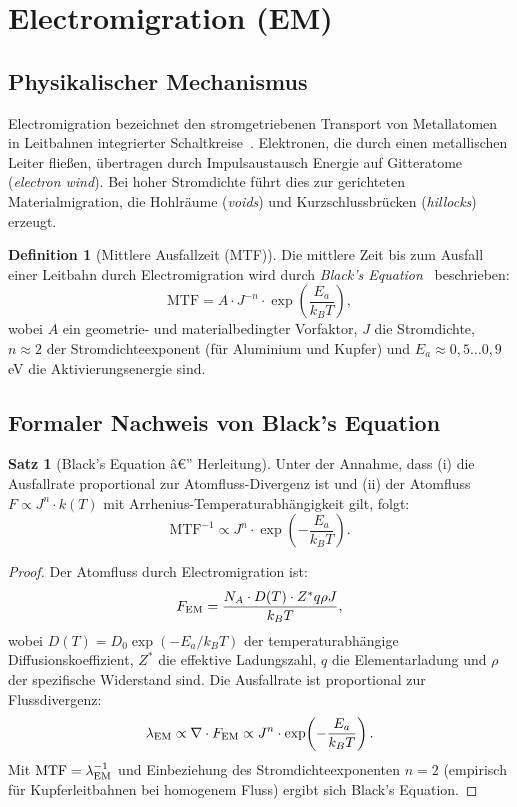 ﻿\documentclass[a4paper,12pt]{article}
\theoremstyle{definition}
\newtheorem{definition}{Definition}
\newtheorem{satz}{Satz}
\begin{document}
\section{Electromigration (EM)}
\label{sec:em}

\subsection{Physikalischer Mechanismus}

Electromigration bezeichnet den stromgetriebenen Transport von Metallatomen
in Leitbahnen integrierter Schaltkreise~\cite{black1969}. Elektronen, die durch
einen metallischen Leiter fließen, übertragen durch Impulsaustausch Energie auf
Gitteratome (\emph{electron wind}). Bei hoher Stromdichte führt dies zur
gerichteten Materialmigration, die Hohlräume (\emph{voids}) und Kurzschlussbrücken
(\emph{hillocks}) erzeugt.

\begin{definition}[Mittlere Ausfallzeit (MTF)]
	Die mittlere Zeit bis zum Ausfall einer Leitbahn durch Electromigration wird
	durch \emph{Black's Equation}~\cite{black1969} beschrieben:
	\[
	\mathrm{MTF} = A \cdot J^{-n} \cdot \exp\!\left(\frac{E_a}{k_B T}\right),
	\]
	wobei $A$ ein geometrie- und materialbedingter Vorfaktor, $J$ die Stromdichte,
	$n \approx 2$ der Stromdichteexponent (für Aluminium und Kupfer) und
	$E_a \approx 0{,}5\ldots 0{,}9$\,eV die Aktivierungsenergie sind.
\end{definition}

\subsection{Formaler Nachweis von Black's Equation}

\begin{satz}[Black's Equation â€” Herleitung]
	\label{satz:black}
	Unter der Annahme, dass (i) die Ausfallrate proportional zur
	Atomfluss-Divergenz ist und (ii) der Atomfluss $F \propto J^n \cdot k(T)$
	mit Arrhenius-Temperaturabhängigkeit gilt, folgt:
	\[
	\mathrm{MTF}^{-1} \propto J^n \cdot \exp\!\left(-\frac{E_a}{k_B T}\right).
	\]
\end{satz}

\begin{proof}
	Der Atomfluss durch Electromigration ist:
	\[
	F_{\rm EM} = \frac{N_A \cdot D(T) \cdot Z^* q \rho J}{k_B T},
	\]
	wobei $D(T) = D_0 \exp(-E_a/k_BT)$ der temperaturabhängige Diffusionskoeffizient,
	$Z^*$ die effektive Ladungszahl, $q$ die Elementarladung und $\rho$ der
	spezifische Widerstand sind. Die Ausfallrate ist proportional zur Flussdivergenz:
	\[
	\lambda_{\rm EM} \propto \nabla \cdot F_{\rm EM} \propto J^n \cdot \exp\!\left(-\frac{E_a}{k_B T}\right).
	\]
	Mit $\mathrm{MTF} = \lambda_{\rm EM}^{-1}$ und Einbeziehung des Stromdichteexponenten
	$n=2$ (empirisch für Kupferleitbahnen bei homogenem Fluss) ergibt sich Black's Equation.
	\qedhere
\end{proof}
\end{document}
